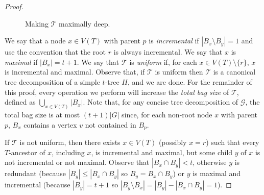 \documentclass[kpfonts]{patmorin}
\theoremstyle{named}
\begin{document}
\begin{proof}
    \begin{figure}
        \caption{Making $\mathcal{T}$ maximally deep.}
        \label{maximal}
    \end{figure}

    We say that a node $x\in V(T)$ with parent $p$ is \emph{incremental} if $|B_x\setminus B_y|=1$ and use the convention that the root $r$ is always incremental.  We say that $x$ is \emph{maximal} if $|B_x|=t+1$.  We say that $\mathcal{T}$ is \emph{uniform} if, for each $x\in V(T)\setminus\{r\}$, $x$ is incremental and maximal.  Observe that, if $\mathcal{T}$ is uniform then $\mathcal{T}$ is a canonical tree decomposition of a simple $t$-tree $H$, and we are done.  For the remainder of this proof, every operation we perform will increase the \emph{total bag size} of $\mathcal{T}$, defined as $\bigcup_{x\in V(T)} |B_x|$.  Note that, for any concise tree decomposition of $\mathcal{G}$, the total bag size is at most $(t+1)|G|$ since, for each non-root node $x$ with parent $p$, $B_x$ contains a vertex $v$ not contained in $B_p$.

    If $\mathcal{T}$ is not uniform, then there exists $x\in V(T)$ (possibly $x=r$) such that every $T$-ancestor of $x$, including $x$, is incremental and maximal, but some child $y$ of $x$ is not incremental or not maximal.  Observe that $|B_x\cap B_y| < t$, otherwise $y$ is redundant (because $|B_y|\le |B_x\cap B_y|$ so $B_y=B_x\cap B_y$) or $y$ is maximal and incremental (because $|B_y|=t+1$ so $|B_y\setminus B_x|=|B_y|-|B_x\cap B_y|=1$).



\end{proof}
\end{document}
